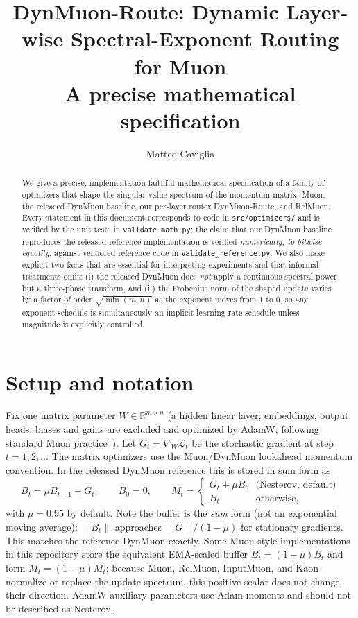 \documentclass{article}
\title{DynMuon-Route: Dynamic Layer-wise Spectral-Exponent Routing for Muon\\
\large A precise mathematical specification}
\author{Matteo Caviglia}
\begin{document}
\maketitle

\begin{abstract}
We give a precise, implementation-faithful mathematical specification of a
family of optimizers that shape the singular-value spectrum of the momentum
matrix: Muon, the released DynMuon baseline, our per-layer router
DynMuon-Route, and RelMuon. Every statement in this document corresponds to
code in \texttt{src/optimizers/} and is verified by the unit tests in
\texttt{validate\_math.py}; the claim that our DynMuon baseline reproduces the
released reference implementation is verified \emph{numerically, to bitwise
equality}, against vendored reference code in
\texttt{validate\_reference.py}. We also make explicit two facts that are
essential for interpreting experiments and that informal treatments omit:
(i) the released DynMuon does \emph{not} apply a continuous spectral power but
a three-phase transform, and (ii) the Frobenius norm of the shaped update
varies by a factor of order $\sqrt{\min(m,n)}$ as the exponent moves from $1$
to $0$, so any exponent schedule is simultaneously an implicit learning-rate
schedule unless magnitude is explicitly controlled.
\end{abstract}

\section{Setup and notation}

Fix one matrix parameter $W \in \mathbb{R}^{m \times n}$ (a hidden linear
layer; embeddings, output heads, biases and gains are excluded and optimized
by AdamW, following standard Muon practice~\cite{jordan2024muon}). Let
$G_t = \nabla_W \mathcal{L}_t$ be the stochastic gradient at step
$t = 1, 2, \dots$ The matrix optimizers use the Muon/DynMuon lookahead
momentum convention. In the released DynMuon reference this is stored in
sum form as
\begin{equation}
\label{eq:momentum}
B_t = \mu B_{t-1} + G_t, \qquad B_0 = 0, \qquad
M_t = \begin{cases} G_t + \mu B_t & \text{(Nesterov, default)}\\
B_t & \text{otherwise,}\end{cases}
\end{equation}
with $\mu = 0.95$ by default. Note the buffer is the \emph{sum} form (not an
exponential moving average): $\|B_t\|$ approaches $\|G\|/(1-\mu)$ for
stationary gradients. This matches the reference DynMuon exactly. Some
Muon-style implementations in this repository store the equivalent
EMA-scaled buffer $\widetilde B_t=(1-\mu)B_t$ and form
$\widetilde M_t=(1-\mu)M_t$; because Muon, RelMuon, InputMuon, and Kaon
normalize or replace the update spectrum, this positive scalar does not change
their direction. AdamW auxiliary parameters use Adam moments and should not be
described as Nesterov.
\end{document}
